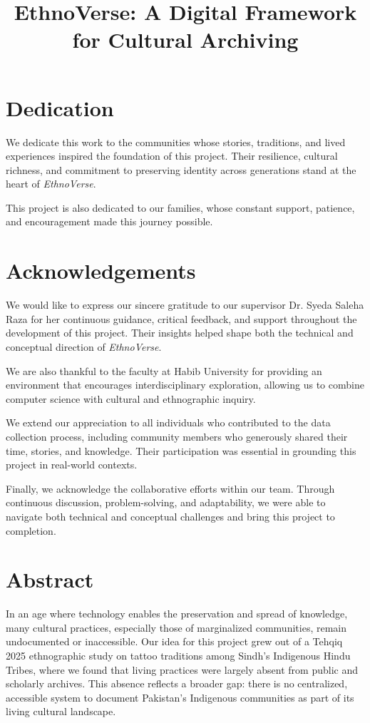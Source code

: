 \documentclass[12pt,twosided]{report}
\title{EthnoVerse: A Digital Framework for Cultural Archiving}
\begin{document}

\chapter*{Dedication}

We dedicate this work to the communities whose stories, traditions, and lived
experiences inspired the foundation of this project. Their resilience,
cultural richness, and commitment to preserving identity across generations
stand at the heart of \textit{EthnoVerse}.

This project is also dedicated to our families, whose constant support,
patience, and encouragement made this journey possible.

\chapter*{Acknowledgements}
We would like to express our sincere gratitude to our supervisor Dr. Syeda Saleha Raza for her
continuous guidance, critical feedback, and support throughout the development
of this project. Their insights helped shape both the technical and conceptual
direction of \textit{EthnoVerse}.

We are also thankful to the faculty at Habib University for providing an
environment that encourages interdisciplinary exploration, allowing us to
combine computer science with cultural and ethnographic inquiry.

We extend our appreciation to all individuals who contributed to the data
collection process, including community members who generously shared their
time, stories, and knowledge. Their participation was essential in grounding
this project in real-world contexts.

Finally, we acknowledge the collaborative efforts within our team. Through
continuous discussion, problem-solving, and adaptability, we were able to
navigate both technical and conceptual challenges and bring this project to
completion.

\chapter*{Abstract}
In an age where technology enables the preservation and spread of knowledge, many cultural practices, especially those of marginalized communities, remain undocumented or inaccessible. Our idea for this project grew out of a Tehqiq 2025 ethnographic study on tattoo traditions among Sindh’s Indigenous Hindu Tribes, where we found that living practices were largely absent from public and scholarly archives. This absence reflects a broader gap: there is no centralized, accessible system to document Pakistan’s Indigenous communities as part of its living cultural landscape.
\end{document}
